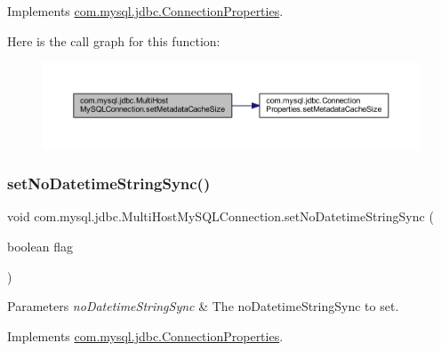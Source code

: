 Implements \mbox{\hyperlink{interfacecom_1_1mysql_1_1jdbc_1_1_connection_properties_aa29a8dc1d36b7044717dce95a3ddbc4e}{com.\+mysql.\+jdbc.\+Connection\+Properties}}.

Here is the call graph for this function\+:
\nopagebreak
\begin{figure}[H]
\begin{center}
\leavevmode
\includegraphics[width=350pt]{classcom_1_1mysql_1_1jdbc_1_1_multi_host_my_s_q_l_connection_a2403357756bbbdea09d2773f42ea3501_cgraph}
\end{center}
\end{figure}
\mbox{\label{classcom_1_1mysql_1_1jdbc_1_1_multi_host_my_s_q_l_connection_a1996dbebf438d31e262c88898b0fbba0}} 
\subsubsection{\texorpdfstring{set\+No\+Datetime\+String\+Sync()}{setNoDatetimeStringSync()}}
{\footnotesize\ttfamily void com.\+mysql.\+jdbc.\+Multi\+Host\+My\+S\+Q\+L\+Connection.\+set\+No\+Datetime\+String\+Sync (\begin{DoxyParamCaption}\item[{boolean}]{flag }\end{DoxyParamCaption})}


\begin{DoxyParams}{Parameters}
{\em no\+Datetime\+String\+Sync} & The no\+Datetime\+String\+Sync to set. \\
\hline
\end{DoxyParams}


Implements \mbox{\hyperlink{interfacecom_1_1mysql_1_1jdbc_1_1_connection_properties_a01c8815660b50a6db2e6f89f796e3ee9}{com.\+mysql.\+jdbc.\+Connection\+Properties}}.

